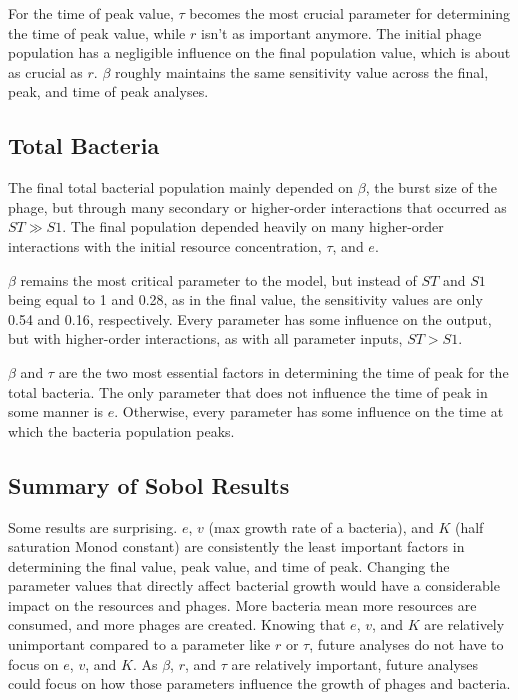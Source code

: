 For the time of peak value, $\tau$ becomes the most crucial parameter for determining the time of peak value, while $r$ isn't as important anymore. 
The initial phage population has a negligible influence on the final population value, which is about as crucial as $r$. 
$\beta$ roughly maintains the same sensitivity value across the final, peak, and time of peak analyses. 

\subsection{Total Bacteria}
The final total bacterial population mainly depended on $\beta$, the burst size of the phage, but through many secondary or higher-order interactions that occurred as $ST \gg S1$. 
The final population depended heavily on many higher-order interactions with the initial resource concentration, $\tau$, and $e$. 

$\beta$ remains the most critical parameter to the model, but instead of $ST$ and $S1$ being equal to 1 and 0.28, as in the final value, the sensitivity values are only 0.54 and 0.16, respectively. 
Every parameter has some influence on the output, but with higher-order interactions, as with all parameter inputs, $ST > S1$. 

$\beta$ and $\tau$ are the two most essential factors in determining the time of peak for the total bacteria. 
The only parameter that does not influence the time of peak in some manner is $e$. 
Otherwise, every parameter has some influence on the time at which the bacteria population peaks. 

\subsection{Summary of Sobol Results}
Some results are surprising. 
$e$, $v$ (max growth rate of a bacteria), and $K$ (half saturation Monod constant) are consistently the least important factors in determining the final value, peak value, and time of peak. 
Changing the parameter values that directly affect bacterial growth would have a considerable impact on the resources and phages. 
More bacteria mean more resources are consumed, and more phages are created. 
Knowing that $e$, $v$, and $K$ are relatively unimportant compared to a parameter like $r$ or $\tau$, future analyses do not have to focus on $e$, $v$, and $K$. 
As $\beta$, $r$, and $\tau$ are relatively important, future analyses could focus on how those parameters influence the growth of phages and bacteria. 

